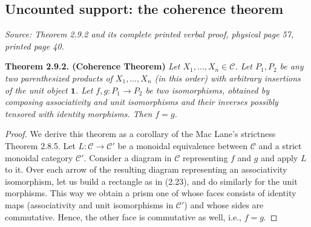\documentclass[11pt]{article}
\newcommand{\cC}{\mathcal C}
\newcommand{\one}{\mathbf 1}
\newcommand{\sourceloc}[1]{\par\smallskip\noindent\textit{Source: #1.}\par\nopagebreak[4]\smallskip}
\begin{document}

\subsection*{Uncounted support: the coherence theorem}
\sourceloc{Theorem 2.9.2 and its complete printed verbal proof, physical page 57, printed page 40}
\noindent\textbf{Theorem 2.9.2. (Coherence Theorem)}
\emph{Let $X_1,\ldots,X_n\in\cC$. Let $P_1,P_2$ be any two parenthesized
products of $X_1,\ldots,X_n$ (in this order) with arbitrary insertions of the
unit object $\one$. Let $f,g:P_1\to P_2$ be two isomorphisms, obtained by
composing associativity and unit isomorphisms and their inverses possibly
tensored with identity morphisms. Then $f=g$.}

\begin{proof}
We derive this theorem as a corollary of the Mac Lane's strictness
Theorem 2.8.5. Let $L:\cC\to\cC'$ be a monoidal equivalence between $\cC$
and a strict monoidal category $\cC'$. Consider a diagram in $\cC$
representing $f$ and $g$ and apply $L$ to it. Over each arrow of the resulting
diagram representing an associativity isomorphism, let us build a rectangle
as in (2.23), and do similarly for the unit morphisms. This way we obtain a
prism one of whose faces consists of identity maps (associativity and unit
isomorphisms in $\cC'$) and whose sides are commutative. Hence, the other
face is commutative as well, i.e., $f=g$.
\end{proof}
\end{document}

